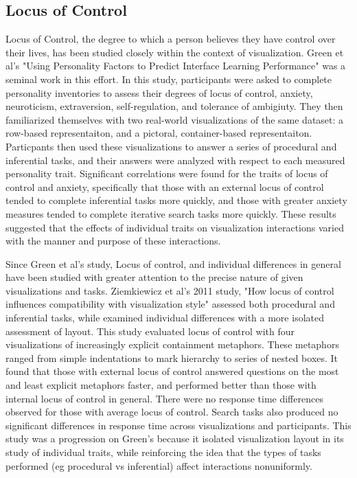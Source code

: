 \documentclass[conference]{IEEEtran}
\begin{document}
\subsection{Locus of Control}\label{LocusOfControl}
Locus of Control, the degree to which a person believes they
have control over their lives, has been studied closely
within the context of visualization. Green et al's 
"Using Personality Factors to Predict Interface Learning Performance"
was a seminal work in this effort. In this study,
participants were asked to complete personality inventories
to assess their degrees of locus of control, anxiety, neuroticism, 
extraversion, self-regulation, and tolerance of ambigiuty. They then
familiarized themselves with two real-world visualizations of the same dataset:
a row-based representaiton, and a pictoral, container-based representaiton.
Particpants then used these visualizations to answer a series of
procedural and inferential tasks, and their answers were analyzed with
respect to each measured personality trait. Significant correlations
were found for the traits of locus of control and anxiety, specifically that
those with an external locus of control tended to complete inferential tasks
more quickly, and those with greater anxiety measures tended to complete
iterative search tasks more quickly\cite{Green2010UsingPF}. These results suggested that the effects
of individual traits on visualization interactions varied with the manner and
purpose of these interactions. 

Since Green et al's study, Locus of control, and
individual differences in general have been studied with greater attention
to the precise nature of given visualizations and tasks. Ziemkiewicz et al's 
2011 study, "How locus of control influences compatibility with visualization style" assessed both procedural and inferential tasks, while
examined individual differences with a more isolated assessment of layout.
This study evaluated locus of control with four visualizations of increasingly
explicit containment metaphors. These metaphors ranged from simple indentations
to mark hierarchy to series of nested boxes. It found that those with external
locus of control answered questions on the most and least explicit metaphors
faster, and performed better than those with internal locus of control in
general. There were no response time differences observed for those with
average locus of control. Search tasks also produced no significant differences
in response time across visualizations and participants\cite{Ziemkiewicz}.
This study was a progression on Green's because it isolated visualization layout
in its study of individual traits, while reinforcing the idea that the types of
tasks performed (eg procedural vs inferential) affect interactions nonuniformly.
\end{document}
